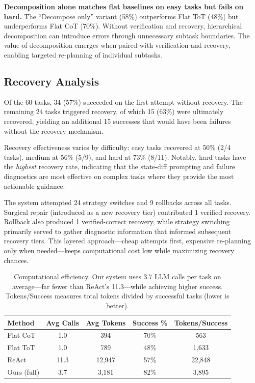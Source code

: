 \documentclass{article}
\begin{document}
\textbf{Decomposition alone matches flat baselines on easy tasks but fails on hard.} The ``Decompose only'' variant (58\%) outperforms Flat ToT (48\%) but underperforms Flat CoT (70\%). Without verification and recovery, hierarchical decomposition can introduce errors through unnecessary subtask boundaries. The value of decomposition emerges when paired with verification and recovery, enabling targeted re-planning of individual subtasks.

\subsection{Recovery Analysis}

Of the 60 tasks, 34 (57\%) succeeded on the first attempt without recovery. The remaining 24 tasks triggered recovery, of which 15 (63\%) were ultimately recovered, yielding an additional 15 successes that would have been failures without the recovery mechanism.

Recovery effectiveness varies by difficulty: easy tasks recovered at 50\% (2/4 tasks), medium at 56\% (5/9), and hard at 73\% (8/11). Notably, hard tasks have the \textit{highest} recovery rate, indicating that the state-diff prompting and failure diagnostics are most effective on complex tasks where they provide the most actionable guidance.

The system attempted 24 strategy switches and 9 rollbacks across all tasks. Surgical repair (introduced as a new recovery tier) contributed 1 verified recovery. Rollback also produced 1 verified-correct recovery, while strategy switching primarily served to gather diagnostic information that informed subsequent recovery tiers. This layered approach---cheap attempts first, expensive re-planning only when needed---keeps computational cost low while maximizing recovery chances.

\begin{table}[h]
\centering
\begin{tabular}{lcccc}
\toprule
\textbf{Method} & \textbf{Avg Calls} & \textbf{Avg Tokens} & \textbf{Success \%} & \textbf{Tokens/Success} \\
\midrule
Flat CoT & 1.0 & 394 & 70\% & 563 \\
Flat ToT & 1.0 & 789 & 48\% & 1,633 \\
ReAct & 11.3 & 12,947 & 57\% & 22,848 \\
Ours (full) & 3.7 & 3,181 & 82\% & 3,895 \\
\bottomrule
\end{tabular}
\caption{Computational efficiency. Our system uses 3.7 LLM calls per task on average---far fewer than ReAct's 11.3---while achieving higher success. Tokens/Success measures total tokens divided by successful tasks (lower is better).}
\label{tab:efficiency}
\end{table}
\end{document}
